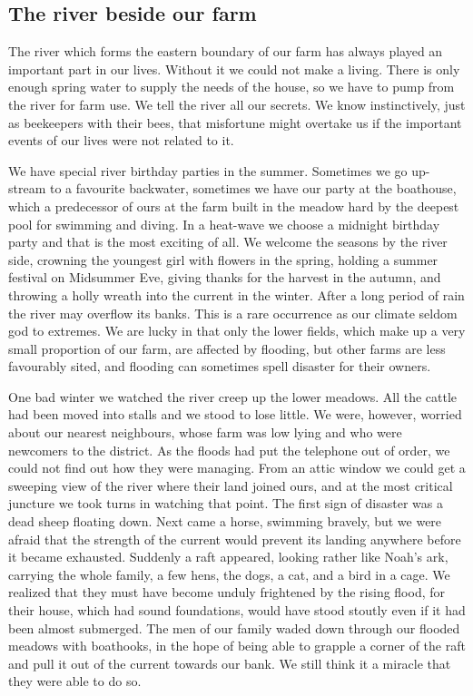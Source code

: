\documentclass[11pt]{article}
\begin{document}
\subsection{The river beside our farm}
\label{sec-1-56}

The river which forms the eastern boundary of our farm has always played an important part in our lives. Without it we could not make a living. There is only enough spring water to supply the needs of the house, so we have to pump from the river for farm use. We tell the river all our secrets. We know instinctively, just as beekeepers with their bees, that misfortune might overtake us if the important events of our lives were not related to it.

We have special river birthday parties in the summer. Sometimes we go up-stream to a favourite backwater, sometimes we have our party at the boathouse, which a predecessor of ours at the farm built in the meadow hard by the deepest pool for swimming and diving. In a heat-wave we choose a midnight birthday party and that is the most exciting of all. We welcome the seasons by the river side, crowning the youngest girl with flowers in the spring, holding a summer festival on Midsummer Eve, giving thanks for the harvest in the autumn, and throwing a holly wreath into the current in the winter. After a long period of rain the river may overflow its banks. This is a rare occurrence as our climate seldom god to extremes. We are lucky in that only the lower fields, which make up a very small proportion of our farm, are affected by flooding, but other farms are less favourably sited, and flooding can sometimes spell disaster for their owners. 

One bad winter we watched the river creep up the lower meadows. All the cattle had been moved into stalls and we stood to lose little. We were, however, worried about our nearest neighbours, whose farm was low lying and who were newcomers to the district. As the floods had put the telephone out of order, we could not find out how they were managing. From an attic window we could get a sweeping view of the river where their land joined ours, and at the most critical juncture we took turns in watching that point. The first sign of disaster was a dead sheep floating down. Next came a horse, swimming bravely, but we were afraid that the strength of the current would prevent its landing anywhere before it became exhausted. Suddenly a raft appeared, looking rather like Noah's ark, carrying the whole family, a few hens, the dogs, a cat, and a bird in a cage. We realized that they must have become unduly frightened by the rising flood, for their house, which had sound foundations, would have stood stoutly even if it had been almost submerged. The men of our family waded down through our flooded meadows with boathooks, in the hope of being able to grapple a corner of the raft and pull it out of the current towards our bank. We still think it a miracle that they were able to do so.
\end{document}
